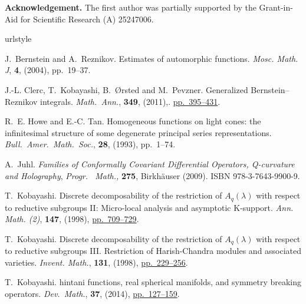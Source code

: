 \documentclass[reqno,12pt]{pja00} %
\theoremstyle{definition}
\theoremstyle{exampstyle} \newtheorem{examp}[theorem]{Theorem}
\begin{document}
	{\bf Acknowledgement.} The first author was partially supported by the Grant-in-Aid for Scientific Research (A) 25247006.
\nocite{kobayashi1998discrete2}
\nocite{kobayashi2015program}
\small
\begin{thebibliography}{14}
\expandafter\ifx\csname urlstyle\endcsname\relax
  \providecommand{\doi}[1]{doi:\discretionary{}{}{}#1}\else
  \providecommand{\doi}{doi:\discretionary{}{}{}\begingroup
  \urlstyle{rm}\Url}\fi

J.~Bernstein and A.~Reznikov.
\newblock Estimates of automorphic functions.
\newblock \emph{{\normalfont Mosc. Math. J}}, \textbf{\textbf{4}}, (2004),
  pp.~19--37.

J.-L. Clerc, T.~Kobayashi, B.~{\O}rsted and M.~Pevzner.
\newblock Generalized {B}ernstein--{R}eznikov integrals.
\newblock \emph{{\normalfont Math.~Ann.}}, \textbf{349}, (2011),.
\href{http://dx.doi.org/10.1007/s00208-010-0516-4}{pp.~395--431}.

R.~E. Howe and E.-C. Tan.
\newblock Homogeneous functions on light cones: the infinitesimal structure of
  some degenerate principal series representations.
\newblock \emph{{\normalfont Bull.~Amer.~Math.~Soc.}}, \textbf{28},
  (1993), pp.~1--74.

A.~Juhl.
\newblock \emph{Families of {C}onformally {C}ovariant {D}ifferential
  {O}perators, {Q}-curvature and {H}olography}, \emph{{\normalfont Progr.~ Math.},} \textbf{275},
\newblock Birkh{\"a}user (2009).
\newblock ISBN 978-3-7643-9900-9.

T.~Kobayashi.
\newblock Discrete decomposability of the restriction of {$A_q(\lambda)$} with
  respect to reductive subgroups {II}: Micro-local analysis and asymptotic
  {K}-support.
  \newblock \emph{{\normalfont Ann. Math. (2)}}, \textbf{147}, (1998),
\href{http://dx.doi.org/10.2307/120963}{pp.~709--729}.

T.~Kobayashi.
\newblock Discrete decomposability of the restriction of {$A_q(\lambda)$} with
  respect to reductive subgroups {III}. {R}estriction of {H}arish-{C}handra
  modules and associated varieties.
\newblock \emph{{\normalfont Invent. Math.}}, \textbf{131}, (1998), 
\href{http://dx.doi.org/10.1007/s002220050203}{pp.~229--256}.

T.~Kobayashi.
hintani functions, real spherical manifolds, and
  symmetry breaking operators.
  \newblock \emph{{\normalfont Dev.~Math.}}, \textbf{37}, (2014),
 \href{http://dx.doi.org/10.4171/OWR/2014/3}{pp.~127--159}.


\end{thebibliography}
\end{document}
